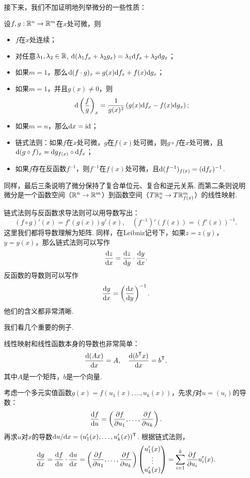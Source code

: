 接下来，我们不加证明地列举微分的一些性质：

\begin{proposition}\label{proposition:derivative-property}
    设$f,g:\mathbb{R}^n\to\mathbb{R}^m$在$x$处可微，则
    \begin{itemize}
        \item $f$在$x$处连续；
        \item 对任意$\lambda_1,\lambda_2\in\mathbb{R}$, $\mathrm{d}(\lambda_1 f_x+\lambda_2 g_x)=\lambda_1\mathrm{d} f_x+\lambda_2\mathrm{d} g_x$；
        \item 如果$m=1$，那么$\mathrm{d}(f\cdot g)_x=g(x)\mathrm{d} f_x+f(x)\mathrm{d} g_x$；
        \item 如果$m=1$，并且$g(x)\neq 0$，则
        \[\mathrm{d}\left(\frac{f}{g}\right)_x=\frac{1}{g(x)^2}\left(g(x)\mathrm{d} f_x-f(x)\mathrm{d} g_x\right);\]
        \item 如果$m=n$，那么$\mathrm{d} x=\mathrm{id}$；
        \item 链式法则：如果$f$在$x$处可微，$g$在$f(x)$处可微，则$g\circ f$在$x$处可微，且$\mathrm{d}(g\circ f)_x=\mathrm{d} g_{f(x)}\circ\mathrm{d} f_x$；
        \item 如果$f$存在反函数$f^{-1}$，则$f^{-1}$在$f(x)$处可微，且$\mathrm{d}(f^{-1})_{f(x)}=(\mathrm{d} f_x)^{-1}$.
    \end{itemize}
\end{proposition}

同样，最后三条说明了微分保持了复合单位元、复合和逆元关系. 而第二条则说明微分是一个函数空间（$\mathbb{R}^n\to\mathbb{R}^m$）到函数空间（$T\mathbb{R}_x^n\to T\mathbb{R}^m_{f(x)}$）的线性映射.

链式法则与反函数求导法则可以用导数写出：
\[(f\circ g)'(x)=f'(g(x))g'(x),\quad (f^{-1})'(f(x))=(f'(x))^{-1}.\]
这里我们都将导数理解为矩阵. 同样，在Leibniz记号下，如果$z=z(y)$，$y=y(x)$，那么链式法则可以写作
\[
    \frac{\mathrm{d} z}{\mathrm{d} x}=\frac{\mathrm{d} z}{\mathrm{d} y}\cdot\frac{\mathrm{d} y}{\mathrm{d} x}.
\]
反函数的导数则可以写作
\[
    \frac{\mathrm{d} y}{\mathrm{d} x}=\left(\frac{\mathrm{d} x}{\mathrm{d} y}\right)^{-1}.
\]
他们的含义都非常清晰. 


我们看几个重要的例子. 

\begin{example}\label{example:linear-derivative}
线性映射和线性函数本身的导数也非常简单：
\[\frac{\mathrm{d} (Ax)}{\mathrm{d} x}=A,\quad \frac{\mathrm{d} (b^{\mathsf{T}} x)}{\mathrm{d} x}=b^{\mathsf{T}}.\]
其中$A$是一个矩阵，$b$是一个向量. 
\end{example}

\begin{example}
    考虑一个多元实值函数$g(x)=f(u_1(x),\dots,u_k(x))$，先求$f$对$u=(u_i)$的导数：
    \[\frac{\mathrm{d} f}{\mathrm{d} u}=\left(\frac{\partial f}{\partial u_1},\dots,\frac{\partial f}{\partial u_k}\right).\]
    再求$u$对$x$的导数$\mathrm{d} u/\mathrm{d} x=(u_1'(x),\dots,u_k'(x))^{\mathsf{T}}$. 根据链式法则，
    \[\frac{\mathrm{d} g}{\mathrm{d} x}=\frac{\mathrm{d} f}{\mathrm{d} u}\cdot\frac{\mathrm{d} u}{\mathrm{d} x}=\left(\frac{\partial f}{\partial u_1},\dots,\frac{\partial f}{\partial u_k}\right)\begin{pmatrix}
        u_1'(x) \\
        \vdots \\
        u_k'(x)
    \end{pmatrix}=\sum_{i=1}^k\frac{\partial f}{\partial u_i}u_i'(x).\]
\end{example}

